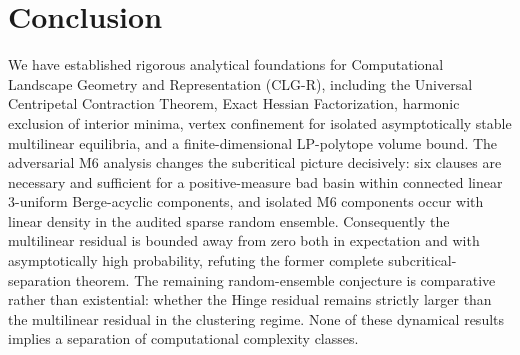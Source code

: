 \documentclass[11pt,a4paper]{article}
\begin{document}
\section{Conclusion}
We have established rigorous analytical foundations for Computational Landscape Geometry and Representation (CLG-R), including the Universal Centripetal Contraction Theorem, Exact Hessian Factorization, harmonic exclusion of interior minima, vertex confinement for isolated asymptotically stable multilinear equilibria, and a finite-dimensional LP-polytope volume bound. The adversarial M6 analysis changes the subcritical picture decisively: six clauses are necessary and sufficient for a positive-measure bad basin within connected linear 3-uniform Berge-acyclic components, and isolated M6 components occur with linear density in the audited sparse random ensemble. Consequently the multilinear residual is bounded away from zero both in expectation and with asymptotically high probability, refuting the former complete subcritical-separation theorem. The remaining random-ensemble conjecture is comparative rather than existential: whether the Hinge residual remains strictly larger than the multilinear residual in the clustering regime. None of these dynamical results implies a separation of computational complexity classes.



\end{document}
